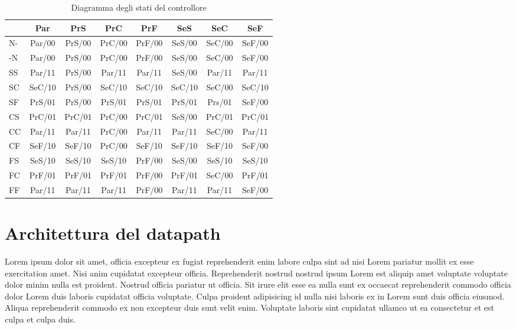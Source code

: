 \documentclass[a4paper]{article}
\begin{document}
\begin{table}[H]
	\begin{center}
		\begin{tabular}{l|c|c|c|c|c|c|c}
			   & Par    & PrS    & PrC    & PrF    & SeS    & SeC    & SeF    \\
			\hline
			N- & Par/00 & PrS/00 & PrC/00 & PrF/00 & SeS/00 & SeC/00 & SeF/00 \\
			\hline
			-N & Par/00 & PrS/00 & PrC/00 & PrF/00 & SeS/00 & SeC/00 & SeF/00 \\
			\hline
			SS & Par/11 & PrS/00 & Par/11 & Par/11 & SeS/00 & Par/11 & Par/11 \\
			\hline
			SC & SeC/10 & PrS/00 & SeC/10 & SeC/10 & SeC/10 & SeC/00 & SeC/10 \\
			\hline
			SF & PrS/01 & PrS/00 & PrS/01 & PrS/01 & PrS/01 & Prs/01 & SeF/00 \\
			\hline
			CS & PrC/01 & PrC/01 & PrC/00 & PrC/01 & SeS/00 & PrC/01 & PrC/01 \\
			\hline
			CC & Par/11 & Par/11 & PrC/00 & Par/11 & Par/11 & SeC/00 & Par/11 \\
			\hline
			CF & SeF/10 & SeF/10 & PrC/00 & SeF/10 & SeF/10 & SeF/10 & SeF/00 \\
			\hline
			FS & SeS/10 & SeS/10 & SeS/10 & PrF/00 & SeS/00 & SeS/10 & SeS/10 \\
			\hline
			FC & PrF/01 & PrF/01 & PrF/01 & PrF/00 & PrF/01 & SeC/00 & PrF/01 \\
			\hline
			FF & Par/11 & Par/11 & Par/11 & PrF/00 & Par/11 & Par/11 & SeF/00 \\
			\hline
		\end{tabular}
	\end{center}
	\caption{Diagramma degli stati del controllore}
\end{table}


\section{Architettura del datapath}
Lorem ipsum dolor sit amet, officia excepteur ex fugiat reprehenderit enim labore culpa sint ad nisi Lorem pariatur mollit ex esse exercitation amet. Nisi anim cupidatat excepteur officia. Reprehenderit nostrud nostrud ipsum Lorem est aliquip amet voluptate voluptate dolor minim nulla est proident. Nostrud officia pariatur ut officia. Sit irure elit esse ea nulla sunt ex occaecat reprehenderit commodo officia dolor Lorem duis laboris cupidatat officia voluptate. Culpa proident adipisicing id nulla nisi laboris ex in Lorem sunt duis officia eiusmod. Aliqua reprehenderit commodo ex non excepteur duis sunt velit enim. Voluptate laboris sint cupidatat ullamco ut ea consectetur et est culpa et culpa duis.
\end{document}
